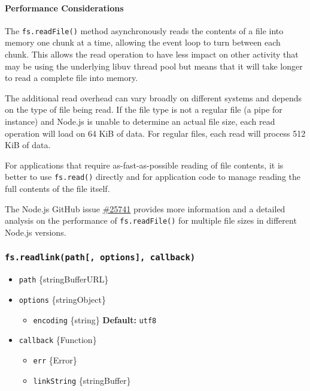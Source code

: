 \paragraph{Performance Considerations}\label{performance-considerations}

The \texttt{fs.readFile()} method asynchronously reads the contents of a
file into memory one chunk at a time, allowing the event loop to turn
between each chunk. This allows the read operation to have less impact
on other activity that may be using the underlying libuv thread pool but
means that it will take longer to read a complete file into memory.

The additional read overhead can vary broadly on different systems and
depends on the type of file being read. If the file type is not a
regular file (a pipe for instance) and Node.js is unable to determine an
actual file size, each read operation will load on 64 KiB of data. For
regular files, each read will process 512 KiB of data.

For applications that require as-fast-as-possible reading of file
contents, it is better to use \texttt{fs.read()} directly and for
application code to manage reading the full contents of the file itself.

The Node.js GitHub issue
\href{https://github.com/nodejs/node/issues/25741}{\#25741} provides
more information and a detailed analysis on the performance of
\texttt{fs.readFile()} for multiple file sizes in different Node.js
versions.

\subsubsection{\texorpdfstring{\texttt{fs.readlink(path{[},\ options{]},\ callback)}}{fs.readlink(path{[}, options{]}, callback)}}\label{fs.readlinkpath-options-callback}

\begin{itemize}
\tightlist
\item
  \texttt{path} \{string\textbar Buffer\textbar URL\}
\item
  \texttt{options} \{string\textbar Object\}

  \begin{itemize}
  \tightlist
  \item
    \texttt{encoding} \{string\} \textbf{Default:}
    \texttt{\textquotesingle{}utf8\textquotesingle{}}
  \end{itemize}
\item
  \texttt{callback} \{Function\}

  \begin{itemize}
  \tightlist
  \item
    \texttt{err} \{Error\}
  \item
    \texttt{linkString} \{string\textbar Buffer\}
  \end{itemize}
\end{itemize}

